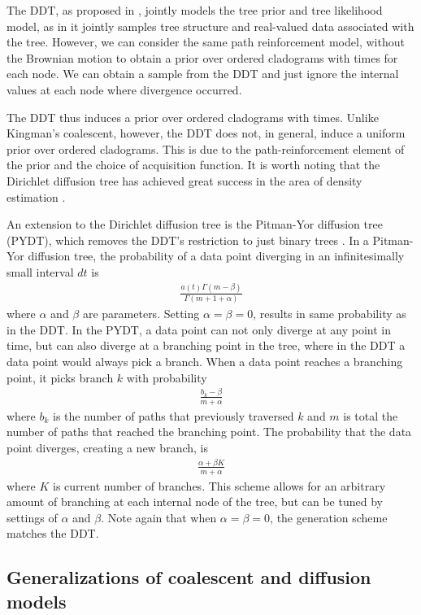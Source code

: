The DDT, as proposed in \citet{Neal2003}, 
jointly models the tree prior and tree likelihood model,
as in it jointly samples tree structure
and real-valued data associated with the tree.
However, we can consider the same
path reinforcement model, without the Brownian motion
to obtain a prior over ordered cladograms
with times for each node.
We can obtain a sample from the DDT and just ignore the
internal values at each node where divergence occurred.

The DDT thus induces a prior over ordered cladograms
with times.
Unlike Kingman's coalescent, however, the DDT
does not, in general, induce a uniform prior over ordered cladograms.
This is due to the path-reinforcement element
of the prior and the choice of acquisition function.
It is worth noting that the Dirichlet diffusion tree has achieved
great success in the area of density estimation \citep{Adams2008}.

An extension to the Dirichlet diffusion tree
is the Pitman-Yor diffusion tree (PYDT),
which removes the DDT's restriction to just binary trees
\citep{Knowles2015}.
In a Pitman-Yor diffusion tree, the probability
of a data point diverging in an infinitesimally small
interval $dt$ is
\begin{align}
  \frac{a(t)\Gamma(m - \beta)}{\Gamma(m + 1 + \alpha)}
\end{align}
where $\alpha$ and $\beta$ are parameters. Setting $\alpha = \beta = 0$,
results in same probability as in the DDT.
In the PYDT, a data point can not only
diverge at any point in time,
but can also diverge at a branching point
in the tree, where in the DDT
a data point would always pick a branch.
When a data point reaches a branching point,
it picks branch $k$
with probability
\begin{align}
  \frac{b_k - \beta}{m + \alpha}
\end{align}
where $b_k$ is the number of paths
that previously traversed $k$
and $m$ is total the number of paths
that reached the branching point.
The probability that the data point
diverges, creating a new branch, is
\begin{align}
  \frac{\alpha + \beta K}{m + \alpha}
\end{align}
where $K$ is current number of branches.
This scheme allows for an arbitrary amount of
branching at each internal node of the tree,
but can be tuned by settings of $\alpha$ and $\beta$.
Note again that when $\alpha = \beta = 0$,
the generation scheme matches the DDT.

\subsection{Generalizations of coalescent and diffusion models}

